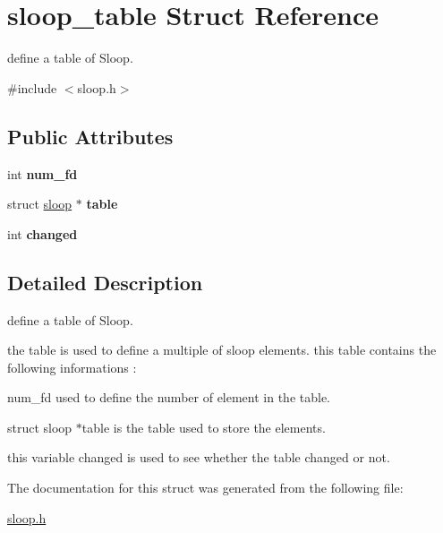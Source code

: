 \hypertarget{structsloop__table}{\section{sloop\-\_\-table \-Struct \-Reference}
\label{structsloop__table}
}


define a table of \-Sloop.  




{\ttfamily \#include $<$sloop.\-h$>$}

\subsection*{\-Public \-Attributes}
\begin{DoxyCompactItemize}
\item 
\hypertarget{structsloop__table_a1428caa6283c37aeef2b3d3d5be3b9cb}{int {\bfseries num\-\_\-fd}}\label{structsloop__table_a1428caa6283c37aeef2b3d3d5be3b9cb}

\item 
\hypertarget{structsloop__table_a5ca647d29e360e9273ad7ce0e8219c97}{struct \hyperlink{structsloop}{sloop} $\ast$ {\bfseries table}}\label{structsloop__table_a5ca647d29e360e9273ad7ce0e8219c97}

\item 
\hypertarget{structsloop__table_a0e212d1293b721a0dd93f73301aca0f4}{int {\bfseries changed}}\label{structsloop__table_a0e212d1293b721a0dd93f73301aca0f4}

\end{DoxyCompactItemize}


\subsection{\-Detailed \-Description}
define a table of \-Sloop. 

the table is used to define a multiple of sloop elements. this table contains the following informations \-:
\begin{DoxyItemize}
\item num\-\_\-fd used to define the number of element in the table.
\item struct sloop $\ast$table is the table used to store the elements.
\item this variable changed is used to see whether the table changed or not. 
\end{DoxyItemize}

\-The documentation for this struct was generated from the following file\-:\begin{DoxyCompactItemize}
\item 
\hyperlink{sloop_8h}{sloop.\-h}\end{DoxyCompactItemize}
